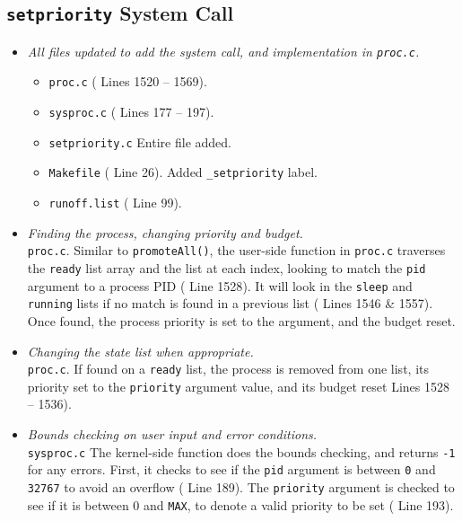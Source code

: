 \documentclass[11pt,letterpaper]{report}
\begin{document}
	
	\subsection{{\tt setpriority} System Call}
	\begin{itemize}
		\item \emph{All files updated to add the system call, and implementation in {\tt proc.c}.}
		\begin{itemize}
			\item {\tt proc.c} ({\color{red} Lines 1520 -- 1569}).
			\item {\tt sysproc.c} ({\color{red} Lines 177 -- 197}).
			\item {\tt setpriority.c} Entire file added.
			\item {\tt Makefile} ({\color{red} Line 26}). Added {\tt \_setpriority} label.
			\item {\tt runoff.list} ({\color{red} Line 99}).
		\end{itemize}
		
		\item \emph{Finding the process, changing priority and budget.}\\
		{\tt proc.c}. Similar to {\tt promoteAll()}, the user-side function in {\tt proc.c} traverses the {\tt ready} list array and the list at each index, looking to match the {\tt pid} argument to a process PID ({\color{red} Line 1528}). It will look in the {\tt sleep} and {\tt running} lists if no match is found in a previous list ({\color{red} Lines 1546 \& 1557}). Once found, the process priority is set to the argument, and the budget reset.
		
		\item \emph{Changing the state list when appropriate.}\\
		{\tt proc.c}. If found on a {\tt ready} list, the process is removed from one list, its priority set to the {\tt priority} argument value, and its budget reset {\color{red} Lines 1528 -- 1536}). 
		
		\item \emph{Bounds checking on user input and error conditions.}\\
		{\tt sysproc.c} The kernel-side function does the bounds checking, and returns {\tt -1} for any errors. First, it checks to see if the {\tt pid} argument is between {\tt 0} and {\tt 32767} to avoid an overflow ({\color{red} Line 189}). The {\tt priority} argument is checked to see if it is between 0 and {\tt MAX}, to denote a valid priority to be set ({\color{red} Line 193}).
		
	\end{itemize}
\end{document}

